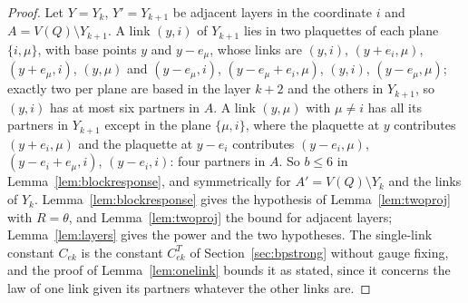 \begin{proof}
Let $Y=Y_k$, $Y'=Y_{k+1}$ be adjacent layers in the coordinate $i$ and
$A=V(Q)\setminus Y_{k+1}$. A link $(y,i)$ of $Y_{k+1}$ lies in two
plaquettes of each plane $\{i,\mu\}$, with base points $y$ and $y-e_\mu$,
whose links are $(y,i)$, $(y+e_i,\mu)$, $(y+e_\mu,i)$, $(y,\mu)$ and
$(y-e_\mu,i)$, $(y-e_\mu+e_i,\mu)$, $(y,i)$, $(y-e_\mu,\mu)$; exactly two per
plane are based in the layer $k+2$ and the others in $Y_{k+1}$, so $(y,i)$
has at most six partners in $A$. A link $(y,\mu)$ with $\mu\ne i$ has all
its partners in $Y_{k+1}$ except in the plane $\{\mu,i\}$, where the
plaquette at $y$ contributes $(y+e_i,\mu)$ and the plaquette at $y-e_i$
contributes $(y-e_i,\mu)$, $(y-e_i+e_\mu,i)$, $(y-e_i,i)$: four partners in
$A$. So $b\le6$ in Lemma~\ref{lem:blockresponse}, and symmetrically for
$A'=V(Q)\setminus Y_k$ and the links of $Y_k$. Lemma~\ref{lem:blockresponse}
gives the hypothesis of Lemma~\ref{lem:twoproj} with $R=\theta$, and
Lemma~\ref{lem:twoproj} the bound for adjacent layers; Lemma~\ref{lem:layers}
gives the power and the two hypotheses. The single-link constant $C_{ek}$ is
the constant $C^T_{ek}$ of Section~\ref{sec:bpstrong} without gauge fixing,
and the proof of Lemma~\ref{lem:onelink} bounds it as stated, since it
concerns the law of one link given its partners whatever the other links
are.
\end{proof}

